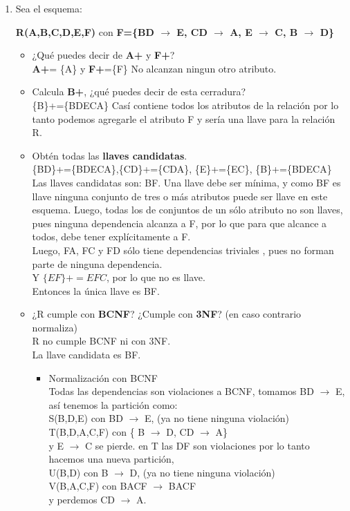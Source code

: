 \documentclass{article}
\begin{document}
\begin{enumerate}
    	\item Sea el esquema:\\
    	\begin{center}
    		\textbf{R(A,B,C,D,E,F)} con \textbf{F=\{BD $\rightarrow$ E, CD $\rightarrow$ A, E $\rightarrow$ C, B $\rightarrow$ D\}}
    	\end{center} 
    	\begin{itemize}
    		\item ¿Qué puedes decir de \textbf{{A}+} y \textbf{{F}+}?\\
    		\textbf{{A}+}= \{A\} y \textbf{{F}+}=\{F\} No alcanzan ningun otro atributo.
    		\item Calcula \textbf{{B}+}, ¿qué puedes decir de esta cerradura?\\
    		\{B\}+=\{BDECA\} Casí contiene todos los atributos de la relación por lo tanto podemos agregarle el atributo F y sería una llave para la relación R.
    		\item  Obtén todas las \textbf{llaves candidatas}.\\
    		\{BD\}+=\{BDECA\},\{CD\}+=\{CDA\}, \{E\}+=\{EC\}, \{B\}+=\{BDECA\}\\
    		Las llaves candidatas son: BF.
    		Una llave debe ser mínima, y como BF es llave
    		ninguna conjunto de tres o más atributos puede ser
    		llave en este esquema. Luego, todas los de conjuntos
    		de un sólo atributo no son llaves, pues ninguna
    		dependencia alcanza a F, por lo que para que
    		alcance a todos, debe tener explícitamente a F.\\
    		Luego, FA, FC y FD sólo tiene dependencias triviales
    		, pues no forman parte de ninguna dependencia.\\
    		Y $\{EF\}+ = EFC$, por lo que no es llave.\\
    		Entonces la única llave es BF.
    		\item  ¿R cumple con \textbf{BCNF}? ¿Cumple con \textbf{3NF}? (en caso contrario normaliza) \\
    		R no cumple BCNF ni con 3NF.\\
    		La llave candidata es BF.
    		\begin{itemize}
    			\item Normalización con BCNF\\
    			Todas las dependencias son violaciones a BCNF, tomamos BD $\rightarrow$ E, así tenemos la partición como:\\
    			S(B,D,E) con BD $\rightarrow$ E, (ya no tiene ninguna violación)\\
    			T(B,D,A,C,F) con \{ B $\rightarrow$ D, CD $\rightarrow$ A\}\\
    			y E $\rightarrow$ C se pierde.
    			en T las DF son violaciones por lo tanto hacemos una nueva partición,\\
    			U(B,D) con B $\rightarrow$ D, (ya no tiene ninguna violación) \\
    			V(B,A,C,F) con BACF $\rightarrow$ BACF\\
    			y perdemos CD $\rightarrow$ A.\\
    			

\end{itemize}
\end{itemize}
\end{enumerate}
\end{document}
